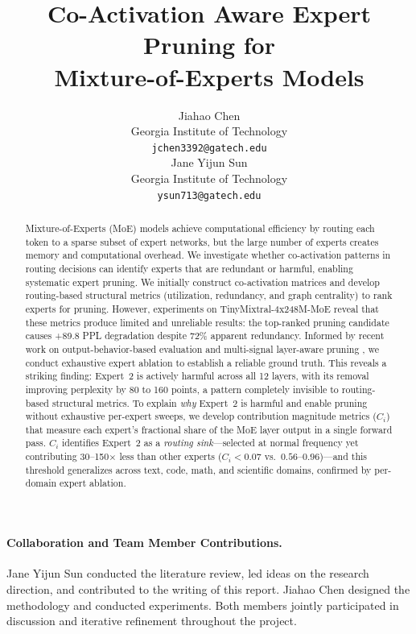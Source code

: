 \documentclass{article}
\title{Co-Activation Aware Expert Pruning for\\Mixture-of-Experts Models}
\author{
Jiahao Chen \\
Georgia Institute of Technology \\
\texttt{jchen3392@gatech.edu} \\
\And
Jane Yijun Sun \\
Georgia Institute of Technology \\
\texttt{ysun713@gatech.edu}
}
\begin{document}
\maketitle

\paragraph{Collaboration and Team Member Contributions.}
Jane Yijun Sun conducted the literature review, led ideas on the research direction, and contributed to the writing of this report. Jiahao Chen designed the methodology and conducted experiments. Both members jointly participated in discussion and iterative refinement throughout the project.

\begin{abstract}
Mixture-of-Experts (MoE) models achieve computational efficiency by routing each token to a sparse subset of expert networks, but the large number of experts creates memory and computational overhead. We investigate whether co-activation patterns in routing decisions can identify experts that are redundant or harmful, enabling systematic expert pruning. We initially construct co-activation matrices and develop routing-based structural metrics (utilization, redundancy, and graph centrality) to rank experts for pruning. However, experiments on TinyMixtral-4x248M-MoE reveal that these metrics produce limited and unreliable results: the top-ranked pruning candidate causes +89.8 PPL degradation despite 72\% apparent redundancy. Informed by recent work on output-behavior-based evaluation \citep{zhang2025mone} and multi-signal layer-aware pruning \citep{yang2025pathfinder}, we conduct exhaustive expert ablation to establish a reliable ground truth. This reveals a striking finding: Expert~2 is actively harmful across all 12 layers, with its removal improving perplexity by 80 to 160 points, a pattern completely invisible to routing-based structural metrics. To explain \emph{why} Expert~2 is harmful and enable pruning without exhaustive per-expert sweeps, we develop contribution magnitude metrics ($C_i$) that measure each expert's fractional share of the MoE layer output in a single forward pass. $C_i$ identifies Expert~2 as a \emph{routing sink}---selected at normal frequency yet contributing 30--150$\times$ less than other experts ($C_i < 0.07$ vs.\ $0.56$--$0.96$)---and this threshold generalizes across text, code, math, and scientific domains, confirmed by per-domain expert ablation.
\end{abstract}
\end{document}
